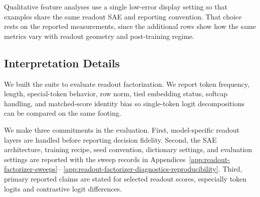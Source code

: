 Qualitative feature analyses use a single low-error display setting so that
examples share the same readout SAE and reporting convention. That choice
rests on the reported measurements, since the additional rows show how the same metrics vary with
readout geometry and post-training regime.

\subsection{Interpretation Details}
\label{sec:app-model-suite-boundaries}

We built the suite to evaluate readout factorization.
We report token frequency, length, special-token behavior, row norm, tied
embedding status, softcap handling, and matched-score identity bias so
single-token logit decompositions can be compared on the same footing.

We make three commitments in the evaluation. First, model-specific readout layers
are handled before reporting decision fidelity. Second, the SAE architecture,
training recipe, seed convention, dictionary settings, and evaluation settings
are reported with the sweep records in
Appendices~\ref{app:readout-factorizer-sweeps}--%
\ref{app:readout-factorizer-diagnostics-reproducibility}.
Third, primary reported claims are stated for selected readout scores,
especially token logits and contrastive logit differences.
